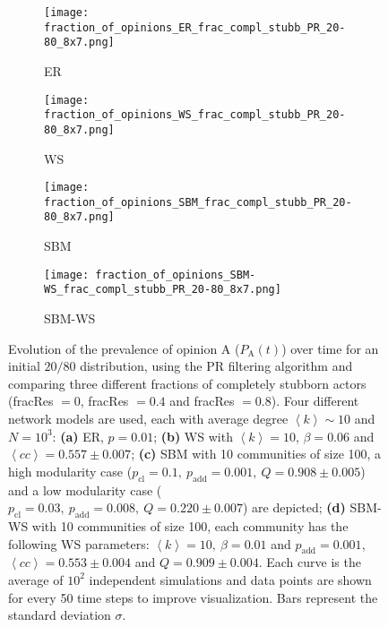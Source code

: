 \documentclass[11 pt , letterpaper , twoside , openright]{book}
\begin{document}
\begin{figure}[H]
  \begin{subfigure}[b]{0.49\textwidth}
    \caption{ER}
  	\texttt{[image: fraction\_of\_opinions\_ER\_frac\_compl\_stubb\_PR\_20-80\_8x7.png]}
  \end{subfigure}
  \begin{subfigure}[b]{0.49\textwidth}
    \caption{WS}
  	\texttt{[image: fraction\_of\_opinions\_WS\_frac\_compl\_stubb\_PR\_20-80\_8x7.png]}
  \end{subfigure}
  \begin{subfigure}[b]{0.49\textwidth}
    \caption{SBM}
    \texttt{[image: fraction\_of\_opinions\_SBM\_frac\_compl\_stubb\_PR\_20-80\_8x7.png]}
  \end{subfigure}
  \begin{subfigure}[b]{0.49\textwidth}
    \caption{SBM-WS}
    \texttt{[image: fraction\_of\_opinions\_SBM-WS\_frac\_compl\_stubb\_PR\_20-80\_8x7.png]}
  \end{subfigure}
  \captionsetup{format=plain}
  \caption[Evolution of the prevalence of opinion A ($P_\text{A}(t)$) over time for an initial $20/80$ opinion distribution, using the PR filtering algorithm and comparing three different fractions of completely stubborn actors (fracRes $= 0$, fracRes $= 0.4$ and fracRes $= 0.8$).]{Evolution of the prevalence of opinion A ($P_\text{A}(t)$) over time for an initial $20/80$ distribution, using the PR filtering algorithm and comparing three different fractions of completely stubborn actors (fracRes $= 0$, fracRes $= 0.4$ and fracRes $= 0.8$). Four different network models are used, each with average degree $\left<k\right> \sim 10$ and $N = 10^3$: \textbf{(a)} ER, $p=0.01$; \textbf{(b)} WS with $\left<k\right> = 10$, $\beta = 0.06$ and $\left<cc\right> = 0.557 \pm 0.007$; \textbf{(c)} SBM with 10 communities of size 100, a high modularity case ($p_{\text{cl}} = 0.1,\ p_{\text{add}} = 0.001,\ Q = 0.908 \pm 0.005$) and a low modularity case ($p_{\text{cl}} = 0.03,\ p_{\text{add}} = 0.008,\ Q = 0.220 \pm 0.007$) are depicted; \textbf{(d)} SBM-WS with 10 communities of size 100, each community has the following WS parameters: $\left<k\right> = 10,\ \beta = 0.01$ and $p_{\text{add}} = 0.001$, $\left<cc\right> = 0.553 \pm 0.004$ and $Q = 0.909 \pm 0.004$. Each curve is the average of $10^2$ independent simulations and data points are shown for every 50 time steps to improve visualization. Bars represent the standard deviation $\sigma$.}%
\label{ev_op_20_80_stubb_PR}
\end{figure}
\end{document}
